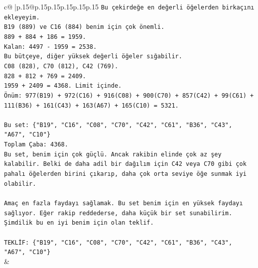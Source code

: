 \documentclass{article}
\begin{document}
{\begin{supertabular}{c@{$\;$}|p{.15\linewidth}@{}p{.15\linewidth}p{.15\linewidth}p{.15\linewidth}p{.15\linewidth}p{.15\linewidth}}
{{{\texttt{Bu çekirdeğe en değerli öğelerden birkaçını ekleyeyim.} \\
\texttt{B19 (889) ve C16 (884) benim için çok önemli.} \\
\texttt{889 + 884 + 186 = 1959.} \\
\texttt{Kalan: 4497 {-} 1959 = 2538.} \\
\texttt{Bu bütçeye, diğer yüksek değerli öğeler sığabilir.} \\
\texttt{C08 (828), C70 (812), C42 (769).} \\
\texttt{828 + 812 + 769 = 2409.} \\
\texttt{1959 + 2409 = 4368. Limit içinde.} \\
\texttt{Önüm: 977(B19) + 972(C16) + 916(C08) + 900(C70) + 857(C42) + 99(C61) + 111(B36) + 161(C43) + 163(A67) + 165(C10) = 5321.} \\
\\ 
\texttt{Bu set: \{"B19", "C16", "C08", "C70", "C42", "C61", "B36", "C43", "A67", "C10"\}} \\
\texttt{Toplam Çaba: 4368.} \\
\texttt{Bu set, benim için çok güçlü. Ancak rakibin elinde çok az şey kalabilir. Belki de daha adil bir dağılım için C42 veya C70 gibi çok pahalı öğelerden birini çıkarıp, daha çok orta seviye öğe sunmak iyi olabilir.} \\
\\ 
\texttt{Amaç en fazla faydayı sağlamak. Bu set benim için en yüksek faydayı sağlıyor. Eğer rakip reddederse, daha küçük bir set sunabilirim. Şimdilik bu en iyi benim için olan teklif.} \\
\\ 
\texttt{TEKLİF: \{"B19", "C16", "C08", "C70", "C42", "C61", "B36", "C43", "A67", "C10"\}} \\
            }
        }
    }
    & \\ \\


\end{supertabular}}
\end{document}
